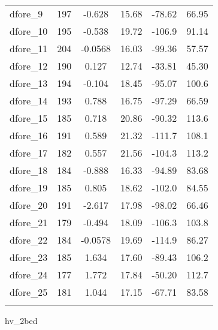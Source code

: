 \begin{tabular}{lccccc}
dfore\_9 & 197 & -0.628 & 15.68 & -78.62 & 66.95 \\
dfore\_10 & 195 & -0.538 & 19.72 & -106.9 & 91.14 \\
dfore\_11 & 204 & -0.0568 & 16.03 & -99.36 & 57.57 \\
dfore\_12 & 190 & 0.127 & 12.74 & -33.81 & 45.30 \\
dfore\_13 & 194 & -0.104 & 18.45 & -95.07 & 100.6 \\
dfore\_14 & 193 & 0.788 & 16.75 & -97.29 & 66.59 \\
dfore\_15 & 185 & 0.718 & 20.86 & -90.32 & 113.6 \\
dfore\_16 & 191 & 0.589 & 21.32 & -111.7 & 108.1 \\
dfore\_17 & 182 & 0.557 & 21.56 & -104.3 & 113.2 \\
dfore\_18 & 184 & -0.888 & 16.33 & -94.89 & 83.68 \\
dfore\_19 & 185 & 0.805 & 18.62 & -102.0 & 84.55 \\
dfore\_20 & 191 & -2.617 & 17.98 & -98.02 & 66.46 \\
dfore\_21 & 179 & -0.494 & 18.09 & -106.3 & 103.8 \\
dfore\_22 & 184 & -0.0578 & 19.69 & -114.9 & 86.27 \\
dfore\_23 & 185 & 1.634 & 17.60 & -89.43 & 106.2 \\
dfore\_24 & 177 & 1.772 & 17.84 & -50.20 & 112.7 \\
dfore\_25 & 181 & 1.044 & 17.15 & -67.71 & 83.58 \\
 &  &  &  &  &  \\ \hline
\end{tabular}
hv\_2bed 
